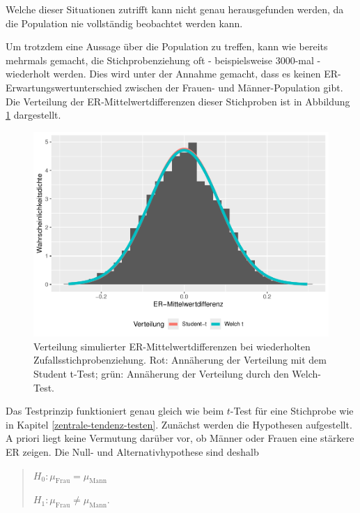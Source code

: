 \documentclass[
]{book}
\theoremstyle{definition}
\theoremstyle{definition}
\theoremstyle{definition}
\theoremstyle{definition}
\theoremstyle{remark}
\begin{document}
Welche dieser Situationen zutrifft kann nicht genau herausgefunden werden, da die Population nie vollständig beobachtet werden kann.

Um trotzdem eine Aussage über die Population zu treffen, kann wie bereits mehrmals gemacht, die Stichprobenziehung oft - beispielsweise \(3000\)-mal - wiederholt werden. Dies wird unter der Annahme gemacht, dass es keinen ER-Erwartungswertunterschied zwischen der Frauen- und Männer-Population gibt. Die Verteilung der ER-Mittelwertdifferenzen dieser Stichproben ist in Abbildung \ref{fig:exm-breakup-hist} dargestellt.

\begin{figure}

{\centering \includegraphics{aps_statistik1_files/figure-latex/exm-breakup-hist-1} 

}

\caption{Verteilung simulierter ER-Mittelwertdifferenzen bei wiederholten Zufallsstichprobenziehung. Rot: Annäherung der Verteilung mit dem Student t-Test; grün: Annäherung der Verteilung durch den Welch-Test.}\label{fig:exm-breakup-hist}
\end{figure}

Das Testprinzip funktioniert genau gleich wie beim \(t\)-Test für eine Stichprobe wie in Kapitel \ref{zentrale-tendenz-testen}. Zunächst werden die Hypothesen aufgestellt. A priori liegt keine Vermutung darüber vor, ob Männer oder Frauen eine stärkere ER zeigen. Die Null- und Alternativhypothese sind deshalb

\begin{quote}
\(H_0: \mu_\text{Frau} = \mu_\text{Mann}\)

\(H_1: \mu_\text{Frau} \neq \mu_\text{Mann}.\)
\end{quote}
\end{document}
